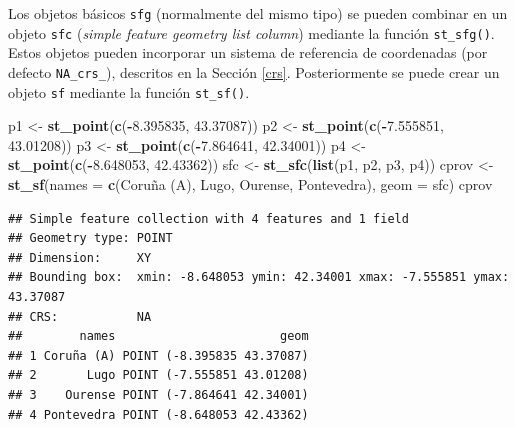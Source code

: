 \documentclass[
]{book}
\newenvironment{Shaded}{\begin{snugshade}}{\end{snugshade}}
\newcommand{\AttributeTok}[1]{\textcolor[rgb]{0.13,0.29,0.53}{#1}}
\newcommand{\FloatTok}[1]{\textcolor[rgb]{0.00,0.00,0.81}{#1}}
\newcommand{\FunctionTok}[1]{\textcolor[rgb]{0.13,0.29,0.53}{\textbf{#1}}}
\newcommand{\NormalTok}[1]{#1}
\newcommand{\OtherTok}[1]{\textcolor[rgb]{0.56,0.35,0.01}{#1}}
\newcommand{\SpecialCharTok}[1]{\textcolor[rgb]{0.81,0.36,0.00}{\textbf{#1}}}
\newcommand{\StringTok}[1]{\textcolor[rgb]{0.31,0.60,0.02}{#1}}
\theoremstyle{break}
\theoremstyle{definition}
\theoremstyle{definition}
\theoremstyle{definition}
\theoremstyle{definition}
\theoremstyle{remark}
\begin{document}
Los objetos básicos \texttt{sfg} (normalmente del mismo tipo) se pueden combinar en un objeto \texttt{sfc} (\emph{simple feature geometry list column}) mediante la función \texttt{st\_sfg()}.
Estos objetos pueden incorporar un sistema de referencia de coordenadas (por defecto \texttt{NA\_crs\_}), descritos en la Sección \ref{crs}.
Posteriormente se puede crear un objeto \texttt{sf} mediante la función \texttt{st\_sf()}.

\begin{Shaded}
\begin{Highlighting}[]
\NormalTok{p1 }\OtherTok{\textless{}{-}} \FunctionTok{st\_point}\NormalTok{(}\FunctionTok{c}\NormalTok{(}\SpecialCharTok{{-}}\FloatTok{8.395835}\NormalTok{, }\FloatTok{43.37087}\NormalTok{))}
\NormalTok{p2 }\OtherTok{\textless{}{-}} \FunctionTok{st\_point}\NormalTok{(}\FunctionTok{c}\NormalTok{(}\SpecialCharTok{{-}}\FloatTok{7.555851}\NormalTok{, }\FloatTok{43.01208}\NormalTok{))}
\NormalTok{p3 }\OtherTok{\textless{}{-}} \FunctionTok{st\_point}\NormalTok{(}\FunctionTok{c}\NormalTok{(}\SpecialCharTok{{-}}\FloatTok{7.864641}\NormalTok{, }\FloatTok{42.34001}\NormalTok{))}
\NormalTok{p4 }\OtherTok{\textless{}{-}} \FunctionTok{st\_point}\NormalTok{(}\FunctionTok{c}\NormalTok{(}\SpecialCharTok{{-}}\FloatTok{8.648053}\NormalTok{, }\FloatTok{42.43362}\NormalTok{))}
\NormalTok{sfc }\OtherTok{\textless{}{-}} \FunctionTok{st\_sfc}\NormalTok{(}\FunctionTok{list}\NormalTok{(p1, p2, p3, p4))}
\NormalTok{cprov }\OtherTok{\textless{}{-}} \FunctionTok{st\_sf}\NormalTok{(}\AttributeTok{names =} \FunctionTok{c}\NormalTok{(}\StringTok{\textquotesingle{}Coruña (A)\textquotesingle{}}\NormalTok{, }\StringTok{\textquotesingle{}Lugo\textquotesingle{}}\NormalTok{, }\StringTok{\textquotesingle{}Ourense\textquotesingle{}}\NormalTok{, }\StringTok{\textquotesingle{}Pontevedra\textquotesingle{}}\NormalTok{),}
    \AttributeTok{geom =}\NormalTok{ sfc)}
\NormalTok{cprov}
\end{Highlighting}
\end{Shaded}

\begin{verbatim}
## Simple feature collection with 4 features and 1 field
## Geometry type: POINT
## Dimension:     XY
## Bounding box:  xmin: -8.648053 ymin: 42.34001 xmax: -7.555851 ymax: 43.37087
## CRS:           NA
##        names                       geom
## 1 Coruña (A) POINT (-8.395835 43.37087)
## 2       Lugo POINT (-7.555851 43.01208)
## 3    Ourense POINT (-7.864641 42.34001)
## 4 Pontevedra POINT (-8.648053 42.43362)
\end{verbatim}
\end{document}
